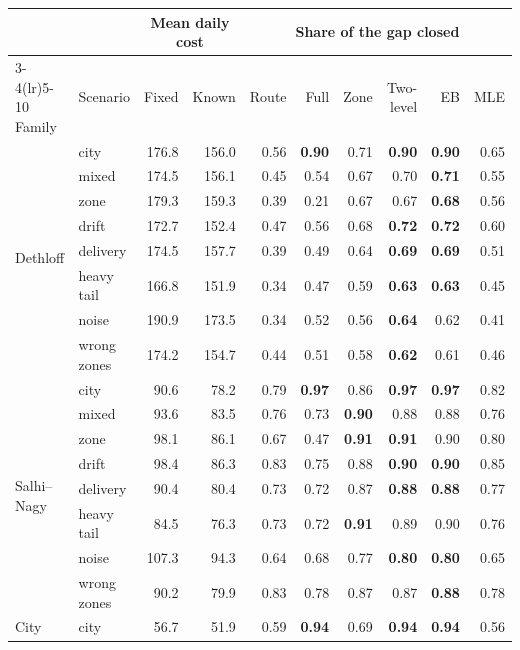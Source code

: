 \begin{tabular}{llrrrrrrrr}
\toprule
 & & \multicolumn{2}{c}{Mean daily cost} & \multicolumn{6}{c}{Share of the gap closed} \\
\cmidrule(lr){3-4}\cmidrule(lr){5-10}
Family & Scenario & Fixed & Known & Route & Full & Zone & Two-level & EB & MLE \\
\midrule
\multirow{8}{*}{Dethloff} & city & 176.8 & 156.0 & 0.56 & \textbf{0.90} & 0.71 & \textbf{0.90} & \textbf{0.90} & 0.65 \\
 & mixed & 174.5 & 156.1 & 0.45 & 0.54 & 0.67 & 0.70 & \textbf{0.71} & 0.55 \\
 & zone & 179.3 & 159.3 & 0.39 & 0.21 & 0.67 & 0.67 & \textbf{0.68} & 0.56 \\
 & drift & 172.7 & 152.4 & 0.47 & 0.56 & 0.68 & \textbf{0.72} & \textbf{0.72} & 0.60 \\
 & delivery & 174.5 & 157.7 & 0.39 & 0.49 & 0.64 & \textbf{0.69} & \textbf{0.69} & 0.51 \\
 & heavy tail & 166.8 & 151.9 & 0.34 & 0.47 & 0.59 & \textbf{0.63} & \textbf{0.63} & 0.45 \\
 & noise & 190.9 & 173.5 & 0.34 & 0.52 & 0.56 & \textbf{0.64} & 0.62 & 0.41 \\
 & wrong zones & 174.2 & 154.7 & 0.44 & 0.51 & 0.58 & \textbf{0.62} & 0.61 & 0.46 \\
\midrule
\multirow{8}{*}{Salhi--Nagy} & city & 90.6 & 78.2 & 0.79 & \textbf{0.97} & 0.86 & \textbf{0.97} & \textbf{0.97} & 0.82 \\
 & mixed & 93.6 & 83.5 & 0.76 & 0.73 & \textbf{0.90} & 0.88 & 0.88 & 0.76 \\
 & zone & 98.1 & 86.1 & 0.67 & 0.47 & \textbf{0.91} & \textbf{0.91} & 0.90 & 0.80 \\
 & drift & 98.4 & 86.3 & 0.83 & 0.75 & 0.88 & \textbf{0.90} & \textbf{0.90} & 0.85 \\
 & delivery & 90.4 & 80.4 & 0.73 & 0.72 & 0.87 & \textbf{0.88} & \textbf{0.88} & 0.77 \\
 & heavy tail & 84.5 & 76.3 & 0.73 & 0.72 & \textbf{0.91} & 0.89 & 0.90 & 0.76 \\
 & noise & 107.3 & 94.3 & 0.64 & 0.68 & 0.77 & \textbf{0.80} & \textbf{0.80} & 0.65 \\
 & wrong zones & 90.2 & 79.9 & 0.83 & 0.78 & 0.87 & 0.87 & \textbf{0.88} & 0.78 \\
\midrule
\multirow{8}{*}{City} & city & 56.7 & 51.9 & 0.59 & \textbf{0.94} & 0.69 & \textbf{0.94} & \textbf{0.94} & 0.56 \\

\end{tabular}
